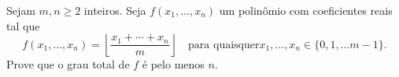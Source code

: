 Sejam $m, n \ge 2$ inteiros. Seja $f(x_1, \dots, x_n)$ um polinômio com coeficientes reais tal que
\[f(x_1, \dots, x_n) = \left \lfloor{\dfrac{x_1 + \cdots + x_n}{m}}\right \rfloor \quad \text{para quaisquer} x_1, \dots, x_n \in \{0, 1, \dots m-1\}.\]
Prove que o grau total de $f$ é pelo menos $n$.
